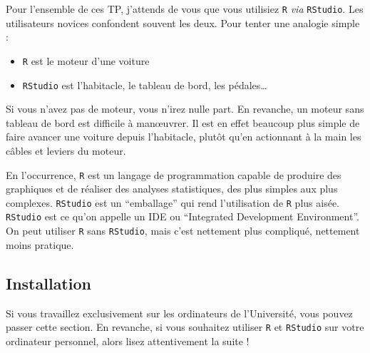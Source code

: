 \documentclass[
  a4paper,
  DIV=11,
  numbers=noendperiod,
  oneside]{scrreprt}
\providecommand{\tightlist}{%
  \setlength{\itemsep}{0pt}\setlength{\parskip}{0pt}}\usepackage{longtable,booktabs,array}
\begin{document}
Pour l'ensemble de ces TP, j'attends de vous que vous utilisiez
\texttt{R} \emph{via} \texttt{RStudio}. Les utilisateurs novices
confondent souvent les deux. Pour tenter une analogie simple :

\begin{itemize}
\tightlist
\item
  \texttt{R} est le moteur d'une voiture
\item
  \texttt{RStudio} est l'habitacle, le tableau de bord, les
  pédales\ldots{}
\end{itemize}

Si vous n'avez pas de moteur, vous n'irez nulle part. En revanche, un
moteur sans tableau de bord est difficile à manœuvrer. Il est en effet
beaucoup plus simple de faire avancer une voiture depuis l'habitacle,
plutôt qu'en actionnant à la main les câbles et leviers du moteur.

En l'occurrence, \texttt{R} est un langage de programmation capable de
produire des graphiques et de réaliser des analyses statistiques, des
plus simples aux plus complexes. \texttt{RStudio} est un ``emballage''
qui rend l'utilisation de \texttt{R} plus aisée. \texttt{RStudio} est ce
qu'on appelle un IDE ou ``Integrated Development Environment''. On peut
utiliser \texttt{R} sans \texttt{RStudio}, mais c'est nettement plus
compliqué, nettement moins pratique.

\subsection{Installation}\label{sec-install}

\begin{tcolorbox}[enhanced jigsaw, coltitle=black, toprule=.15mm, opacityback=0, breakable, colback=white, opacitybacktitle=0.6, colframe=quarto-callout-warning-color-frame, leftrule=.75mm, rightrule=.15mm, titlerule=0mm, bottomtitle=1mm, toptitle=1mm, arc=.35mm, title=\textcolor{quarto-callout-warning-color}{\faExclamationTriangle}\hspace{0.5em}{Avertissement}, colbacktitle=quarto-callout-warning-color!10!white, bottomrule=.15mm, left=2mm]

Si vous travaillez exclusivement sur les ordinateurs de l'Université,
vous pouvez passer cette section. En revanche, si vous souhaitez
utiliser \texttt{R} et \texttt{RStudio} sur votre ordinateur personnel,
alors lisez attentivement la suite !

\end{tcolorbox}
\end{document}
